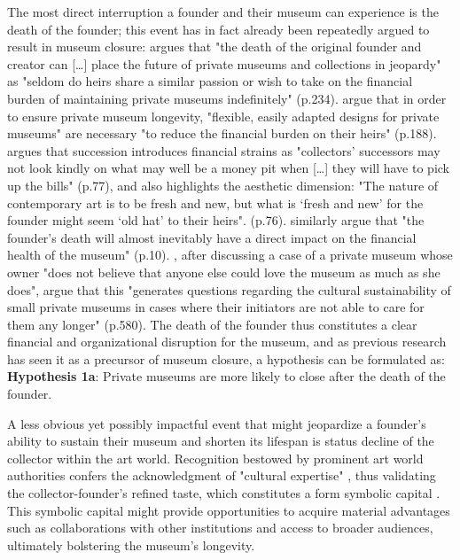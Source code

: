 \documentclass[12pt]{article}
\begin{document}
The most direct interruption a founder and their museum can experience is the death of the founder; this event has in fact already been repeatedly argued to result in museum closure:
\textcite{Walker_2019_collector} argues that "the death of the original founder and creator can [\ldots{}] place the future of private museums and collections in jeopardy" as "seldom do heirs share a similar passion or wish to take on the financial burden of maintaining private museums indefinitely" (p.234). 
\textcite{Bechtler_Imhof_2018_future} argue that in order to ensure private museum longevity, "flexible, easily adapted designs for private museums" are necessary "to reduce the financial burden on their heirs" (p.188).
\textcite{Adam_2021_rise} argues that succession introduces financial strains as "collectors’ successors may not look kindly on what may well be a money pit when [\ldots{}] they will have to pick up the bills" (p.77), and also highlights the aesthetic dimension: "The nature of contemporary art is to be fresh and new, but what is ‘fresh and new’ for the founder might seem ‘old hat’ to their heirs". (p.76).
\textcite{Velthuis_Gera_2024_fragility} similarly argue that "the founder’s death will almost inevitably have a direct impact on the financial health of the museum" (p.10).
\textcite{StylianouLambert_etal_2014_museums}, after discussing a case of a private museum whose owner "does not believe that anyone else could love the museum as much as she does", argue that this "generates questions regarding the cultural sustainability of small private museums in cases where their initiators are not able to care for them any longer" (p.580).
The death of the founder thus constitutes a clear financial and organizational disruption for the museum, and as previous research has seen it as a precursor of museum closure, a hypothesis can be formulated as:
\bigbreak
\noindent
\textbf{Hypothesis 1a}: Private museums are more likely to close after the death of the founder.



A less obvious yet possibly impactful event that might jeopardize a founder's ability to sustain their museum and shorten its lifespan is status decline of the collector within the art world.
Recognition bestowed by prominent art world authorities confers the acknowledgment of "cultural expertise" \parencite[p.1486]{Braden_2016_recognition}, thus validating the collector-founder's refined taste, which constitutes a form symbolic capital \parencite{Bourdieu_1993_production}.
This symbolic capital might provide opportunities to acquire material advantages such as collaborations with other institutions and access to broader audiences, ultimately bolstering the museum's longevity.
\end{document}
